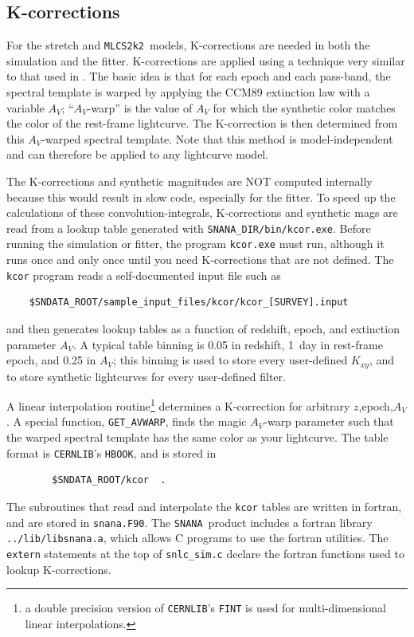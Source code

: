 \documentclass[12pt]{article}
\newcommand{\mlcs}{{\tt MLCS2k2}}
\newcommand{\snana}{{\tt SNANA}}
\newcommand{\snanadir}{{\tt SNANA\_DIR}}
\begin{document}
{%
   \clearpage
   \subsection{K-corrections }
   \label{subsec:simKcor}

For the stretch and \mlcs\ models,
K-corrections are needed in both the simulation and the fitter.
K-corrections are applied using a technique very
similar to that used in \cite{Nugent2002,JRK07}.
The basic idea is that
for each epoch and each pass-band, the spectral template
is warped by applying the CCM89 extinction law with
a variable $A_V$;  ``$A_V$-warp'' is the value
of $A_V$ for which the synthetic color
matches the color of the rest-frame lightcurve.
The K-correction is then determined from this
$A_V$-warped spectral template.
Note that this method is model-independent and can 
therefore be applied to any lightcurve model.


The K-corrections and synthetic magnitudes are NOT computed internally
because this would result in slow code, especially for the fitter.
To speed up the calculations of these convolution-integrals,
K-corrections and synthetic mags are read from a lookup table generated 
with \snanadir{\tt /bin/kcor.exe}.
Before running the simulation or fitter, the program {\tt kcor.exe} 
must run, although it runs once and only once
until you need K-corrections that are not defined.
The {\tt kcor} program reads a self-documented input file 
such as
%
\begin{verbatim}
    $SNDATA_ROOT/sample_input_files/kcor/kcor_[SURVEY].input
\end{verbatim}
%
and then generates lookup tables as a function of
redshift, epoch, and extinction parameter $A_V$.
A typical table binning is 0.05 in redshift,
1~day in rest-frame epoch, and 0.25 in $A_V$;
this binning is used to store every user-defined $K_{xy}$,
and to store synthetic lightcurves for every user-defined filter.

A linear interpolation routine\footnote{ a double precision version
   of {\tt CERNLIB}'s {\tt FINT} is used for multi-dimensional linear
   interpolations.}
determines a K-correction for arbitrary $z$,epoch,$A_V$.
A special function, {\tt GET\_AVWARP}, finds the magic $A_V$-warp
parameter such that the warped spectral template has the same color
as your lightcurve.
The table format is {\tt CERNLIB}'s {\tt HBOOK},
and is stored in 
\begin{verbatim}
        $SNDATA_ROOT/kcor  .
\end{verbatim}
%
The subroutines that read and interpolate the {\tt kcor} tables 
are written in fortran, and are stored in {\tt snana.F90}.
The \snana\ product includes a fortran library {\tt ../lib/libsnana.a},
which allows C programs to use the fortran utilities.
The {\tt extern} statements at the top of {\tt snlc\_sim.c}
declare the fortran functions used to lookup K-corrections.

}
\end{document}
